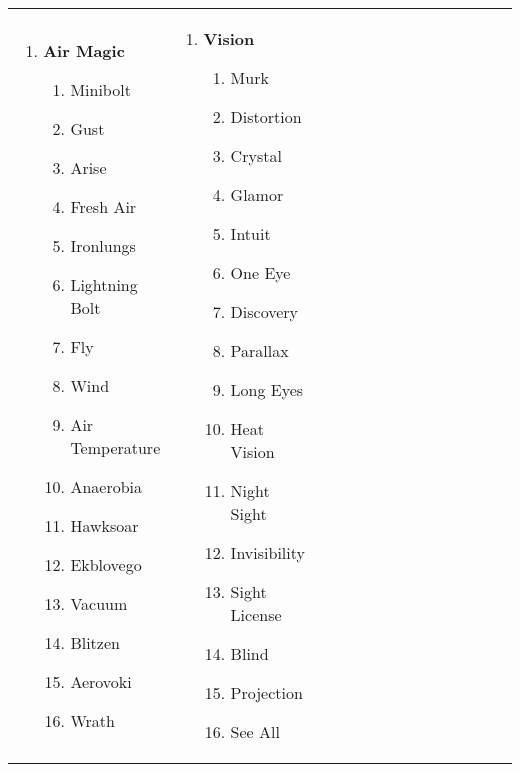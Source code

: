 \renewcommand{\labelenumii}{\arabic{enumii}.}
\begin{tabular}{@{} p{0.25\linewidth} p{0.25\linewidth} p{0.25\linewidth} p{0.25\linewidth}}
\begin{enumerate}
	\item \textbf{Air Magic}
	\begin{enumerate}
		\item Minibolt
		\item Gust
		\item Arise
		\item Fresh Air
		\item Ironlungs
		\item Lightning Bolt
		\item Fly
		\item Wind
		\item Air Temperature
		\item Anaerobia
		\item Hawksoar
		\item Ekblovego
		\item Vacuum
		\item Blitzen
		\item Aerovoki
		\item Wrath
	\end{enumerate}
\end{enumerate} &
\begin{enumerate}
	\item \textbf{Vision}
	\begin{enumerate}
		\item Murk
		\item Distortion
		\item Crystal
		\item Glamor
		\item Intuit
		\item One Eye
		\item Discovery
		\item Parallax
		\item Long Eyes
		\item Heat Vision
		\item Night Sight
		\item Invisibility
		\item Sight License
		\item Blind
		\item Projection
		\item See All
	\end{enumerate}
\end{enumerate} &
\begin{enumerate}

\end{enumerate}
\end{tabular}
